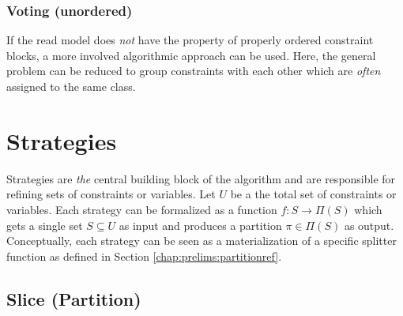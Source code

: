 			\subsubsection{Voting (unordered)}
			\label{chap:tree:classifiers:cooccurence}

				If the read model does \textit{not} have the property of properly ordered constraint blocks, a more involved algorithmic approach can be used.
				Here, the general problem can be reduced to group constraints with each other which are \textit{often} assigned to the same class. 

				\clearpage

%
%			

	\section{Strategies}
	\label{chap:tree:strategies}

		Strategies are \textit{the} central building block of the algorithm and are responsible for refining sets of constraints or variables.
		Let $U$ be a the total set of constraints or variables.
		Each strategy can be formalized as a function $f: S \rightarrow \Pi(S)$ which gets a single set $S \subseteq U$ as input and produces a partition $\pi \in \Pi(S)$ as output.
		Conceptually, each strategy can be seen as a materialization of a specific splitter function as defined in Section \ref{chap:prelims:partitionref}.


		\subsection{Slice (Partition)}
		\label{chap:tree:strategies:slice:part}

